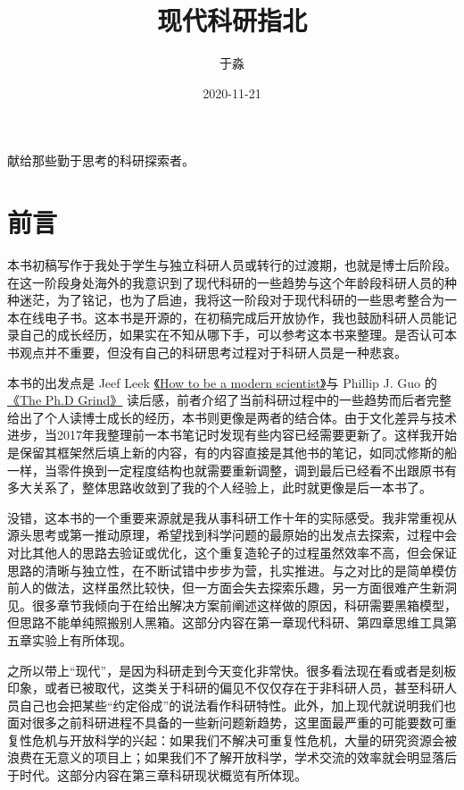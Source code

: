 \documentclass[]{tufte-book}
\title{现代科研指北}
\author{于淼}
\date{2020-11-21}
\begin{document}
\maketitle



{
\setcounter{tocdepth}{1}
\tableofcontents
}

献给那些勤于思考的科研探索者。

\hypertarget{ux524dux8a00}{%
\chapter{前言}\label{ux524dux8a00}}

本书初稿写作于我处于学生与独立科研人员或转行的过渡期，也就是博士后阶段。在这一阶段身处海外的我意识到了现代科研的一些趋势与这个年龄段科研人员的种种迷茫，为了铭记，也为了启迪，我将这一阶段对于现代科研的一些思考整合为一本在线电子书。这本书是开源的，在初稿完成后开放协作，我也鼓励科研人员能记录自己的成长经历，如果实在不知从哪下手，可以参考这本书来整理。是否认可本书观点并不重要，但没有自己的科研思考过程对于科研人员是一种悲哀。

本书的出发点是 Jeef Leek \href{https://leanpub.com/modernscientist}{《How to be a modern scientist》}与 Phillip J. Guo 的\href{https://www.goodreads.com/en/book/show/15731248-the-ph-d-grind}{《The Ph.D Grind》} 读后感，前者介绍了当前科研过程中的一些趋势而后者完整给出了个人读博士成长的经历，本书则更像是两者的结合体。由于文化差异与技术进步，当2017年我整理前一本书笔记时发现有些内容已经需要更新了。这样我开始是保留其框架然后填上新的内容，有的内容直接是其他书的笔记，如同忒修斯的船一样，当零件换到一定程度结构也就需要重新调整，调到最后已经看不出跟原书有多大关系了，整体思路收敛到了我的个人经验上，此时就更像是后一本书了。

没错，这本书的一个重要来源就是我从事科研工作十年的实际感受。我非常重视从源头思考或第一推动原理，希望找到科学问题的最原始的出发点去探索，过程中会对比其他人的思路去验证或优化，这个重复造轮子的过程虽然效率不高，但会保证思路的清晰与独立性，在不断试错中步步为营，扎实推进。与之对比的是简单模仿前人的做法，这样虽然比较快，但一方面会失去探索乐趣，另一方面很难产生新洞见。很多章节我倾向于在给出解决方案前阐述这样做的原因，科研需要黑箱模型，但思路不能单纯照搬别人黑箱。这部分内容在第一章现代科研、第四章思维工具第五章实验上有所体现。

之所以带上``现代''，是因为科研走到今天变化非常快。很多看法现在看或者是刻板印象，或者已被取代，这类关于科研的偏见不仅仅存在于非科研人员，甚至科研人员自己也会把某些``约定俗成''的说法看作科研特性。此外，加上现代就说明我们也面对很多之前科研进程不具备的一些新问题新趋势，这里面最严重的可能要数可重复性危机与开放科学的兴起：如果我们不解决可重复性危机，大量的研究资源会被浪费在无意义的项目上；如果我们不了解开放科学，学术交流的效率就会明显落后于时代。这部分内容在第三章科研现状概览有所体现。
\end{document}
